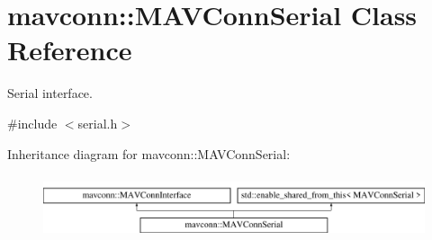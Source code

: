 \hypertarget{classmavconn_1_1MAVConnSerial}{}\section{mavconn\+::M\+A\+V\+Conn\+Serial Class Reference}
\label{classmavconn_1_1MAVConnSerial}


Serial interface.  




{\ttfamily \#include $<$serial.\+h$>$}

Inheritance diagram for mavconn\+::M\+A\+V\+Conn\+Serial\+:\begin{figure}[H]
\begin{center}
\leavevmode
\includegraphics[height=1.866667cm]{classmavconn_1_1MAVConnSerial}
\end{center}
\end{figure}
